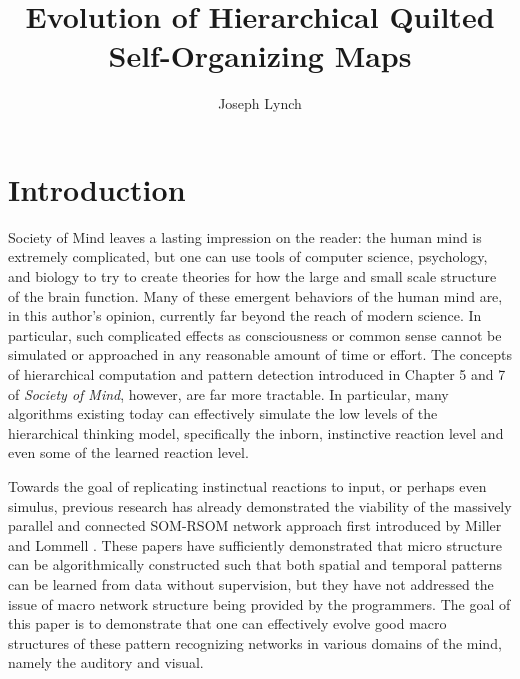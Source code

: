 \documentclass[12pt,a4paper]{article}
\author{Joseph Lynch}
\title{Evolution of Hierarchical Quilted Self-Organizing Maps}
\begin{document}

\maketitle

\section{Introduction}
Society of Mind leaves a lasting impression on the reader: the human mind is extremely complicated, but one can use tools of computer science, psychology, and biology to try to create theories for how the large and small scale structure of the brain function.  Many of these emergent behaviors of the human mind are, in this author's opinion, currently far beyond the reach of modern science.  In particular, such complicated effects as consciousness or common sense cannot be simulated or approached in any reasonable amount of time or effort. The concepts of hierarchical computation and pattern detection introduced in Chapter 5 and 7 of \textit{Society of Mind}, however, are far more tractable.  In particular, many algorithms existing today can effectively simulate the low levels of the hierarchical thinking model, specifically the inborn, instinctive reaction level and even some of the learned reaction level.

Towards the goal of replicating instinctual reactions to input, or perhaps even simulus, previous research has already demonstrated the viability of the massively parallel and connected SOM-RSOM network approach first introduced by Miller and Lommell \cite{MLPaper} \cite{HQSOM}.  These papers have sufficiently demonstrated that micro structure can be algorithmically constructed such that both spatial and temporal patterns can be learned from data without supervision, but they have not addressed the issue of macro network structure being provided by the programmers. The goal of this paper is to demonstrate that one can effectively evolve good macro structures of these pattern recognizing networks in various domains of the mind, namely the auditory and visual.
\end{document}
